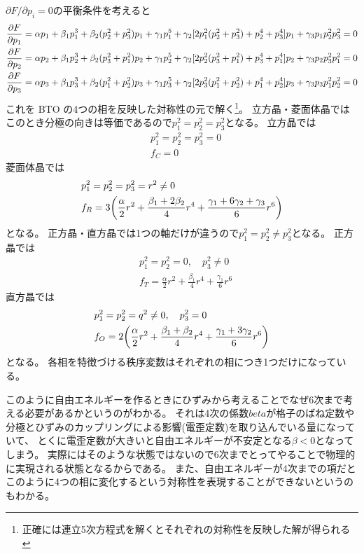 \documentclass[11pt,dvipdfmx,a4paper]{jsarticle}
\begin{document}
\(\partial F/ \partial p_i = 0\)の平衡条件を考えると
\begin{align}
    \pdv{F}{p_1} &= \alpha p_1 +\beta_1p_1^3+ \beta_2(p_2^2+p_3^2)p_1
    +\gamma_1p_1^5+\gamma_2[2p_1^2(p_2^2+p_3^2)+p_2^4+p_3^4]p_1+\gamma_3p_1p_2^2p_3^2 = 0\\
    \pdv{F}{p_2} &= \alpha p_2 +\beta_1p_2^3+ \beta_2(p_3^2+p_1^2)p_2
    +\gamma_1p_2^5+\gamma_2[2p_2^2(p_3^2+p_1^2)+p_3^4+p_1^4]p_2+\gamma_3p_2p_3^2p_1^2 = 0\\
    \pdv{F}{p_3} &= \alpha p_3 +\beta_1p_3^3+ \beta_2(p_1^2+p_2^2)p_3
    +\gamma_1p_3^5+\gamma_2[2p_3^2(p_1^2+p_2^2)+p_1^4+p_2^4]p_3+\gamma_3p_3p_1^2p_2^2 = 0
\end{align}
これを BTO の4つの相を反映した対称性の元で解く\footnote{正確には連立5次方程式を解くとそれぞれの対称性を反映した解が得られる}。
立方晶・菱面体晶では
このとき分極の向きは等価であるので\(p_1^2 = p_2^2 = p_3^2\)となる。
立方晶では
\begin{align}
    &p_1^2 = p_2^2 = p_3^2 =0\\
    &f_C = 0
\end{align}
菱面体晶では
\begin{align}
    &p_1^2 = p_2^2 = p_3^2 = r^2 \neq 0\\
    &f_R = 3\qty(\frac{\alpha}{2}r^2+\frac{\beta_1+2\beta_2}{4}r^4+\frac{\gamma_1+6\gamma_2+\gamma_3}{6}r^6)
\end{align}
となる。
正方晶・直方晶では1つの軸だけが違うので\(p_1^2 = p_2^2 \neq p_3^2\)となる。
正方晶では
\begin{align}
    &p_1^2 = p_2^2 = 0, \quad p_3^2 \neq 0\\
    &f_T = \frac{\alpha}{2}r^2+\frac{\beta_1}{4}r^4+\frac{\gamma_1}{6}r^6
\end{align}
直方晶では
\begin{align}
    &p_1^2 = p_2^2 = q^2 \neq 0, \quad p_3^2 = 0\\
    &f_O = 2\qty(\frac{\alpha}{2}r^2+\frac{\beta_1+\beta_2}{4}r^4+\frac{\gamma_1+3\gamma_2}{6}r^6)
\end{align}
となる。
各相を特徴づける秩序変数はそれぞれの相につき1つだけになっている。

このように自由エネルギーを作るときにひずみから考えることでなぜ6次まで考える必要があるかというのがわかる。
それは4次の係数\(beta\)が格子のばね定数や分極とひずみのカップリングによる影響(電歪定数)を取り込んでいる量になっていて、
とくに電歪定数が大きいと自由エネルギーが不安定となる\(\beta<0\)となってしまう。
実際にはそのような状態ではないので6次までとってやることで物理的に実現される状態となるからである。
また、自由エネルギーが4次までの項だとこのように4つの相に変化するという対称性を表現することができないというのもわかる。
\end{document}
